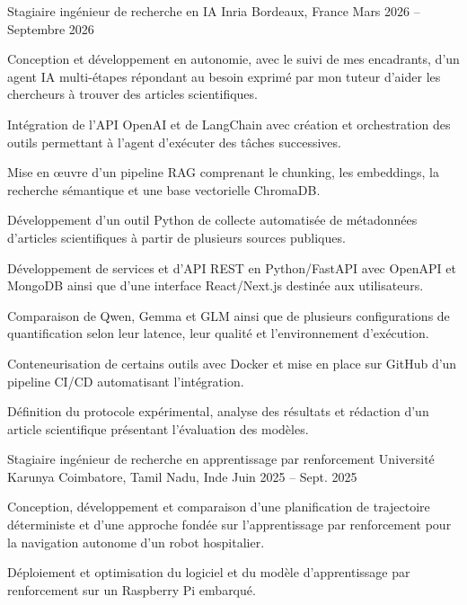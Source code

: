 
\begin{cventries}
  \cventry
    {Stagiaire ingénieur de recherche en IA}
    {Inria}
    {Bordeaux, France}
    {Mars 2026 -- Septembre 2026}
    {
      \begin{cvitems}
        \item {Conception et développement en autonomie, avec le suivi de mes encadrants, d’un agent IA multi-étapes répondant au besoin exprimé par mon tuteur d’aider les chercheurs à trouver des articles scientifiques.}
        \item {Intégration de l’API OpenAI et de LangChain avec création et orchestration des outils permettant à l’agent d’exécuter des tâches successives.}
        \item {Mise en œuvre d’un pipeline RAG comprenant le chunking, les embeddings, la recherche sémantique et une base vectorielle ChromaDB.}
        \item {Développement d’un outil Python de collecte automatisée de métadonnées d’articles scientifiques à partir de plusieurs sources publiques.}
        \item {Développement de services et d’API REST en Python/FastAPI avec OpenAPI et MongoDB ainsi que d’une interface React/Next.js destinée aux utilisateurs.}
        \item {Comparaison de Qwen, Gemma et GLM ainsi que de plusieurs configurations de quantification selon leur latence, leur qualité et l’environnement d’exécution.}
        \item {Conteneurisation de certains outils avec Docker et mise en place sur GitHub d’un pipeline CI/CD automatisant l’intégration.}
        \item {Définition du protocole expérimental, analyse des résultats et rédaction d’un article scientifique présentant l’évaluation des modèles.}
      \end{cvitems}
    }

  \cventry
    {Stagiaire ingénieur de recherche en apprentissage par renforcement}
    {Université Karunya}
    {Coimbatore, Tamil Nadu, Inde}
    {Juin 2025 -- Sept. 2025}
    {
      \begin{cvitems}
        \item {Conception, développement et comparaison d’une planification de trajectoire déterministe et d’une approche fondée sur l’apprentissage par renforcement pour la navigation autonome d’un robot hospitalier.}
        \item {Déploiement et optimisation du logiciel et du modèle d’apprentissage par renforcement sur un Raspberry Pi embarqué.}
      \end{cvitems}
    }
\end{cventries}
